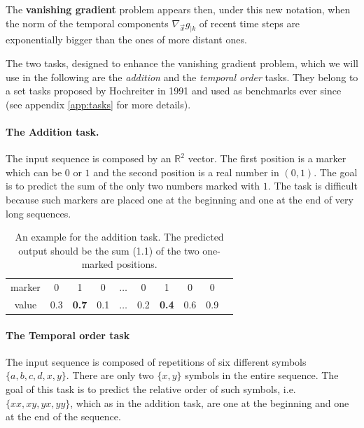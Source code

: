 The \textbf{vanishing gradient} problem appears then, under this new notation, when the norm of the temporal components $\nabla_{\vec{x}} g_{|k}$ of recent time steps  are exponentially bigger than the ones of more distant ones.

The two tasks, designed to enhance the vanishing gradient problem, which we will use in the following are the \textit{addition} and the \textit{temporal order} tasks. They belong to a set tasks proposed by Hochreiter\cite{lstm} in 1991 and used as benchmarks ever since (see appendix \ref{app:tasks} for more details).

\paragraph{The Addition task.}
The input sequence is composed by an $\mathbb{R}^2$ vector. The first position is a marker which can be $0$ or $1$ and the second position is a real number in $(0,1)$. The goal is to predict the sum of the only two numbers marked with $1$. The task is difficult because such markers are placed one at the beginning and one at the end of very long sequences.

\begin{table}[h]
	\centering
\begin{tabular}{|c|c|c|c|c|c|c|c|c|c}
	\hline  marker & 0&  1&  0&  $\hdots$& 0 & 1 & 0 & 0  \\ 
	value & 0.3&  \textbf{0.7}&  0.1&  $\hdots$& 0.2& \textbf{0.4} & 0.6& 0.9  \\ 
	\hline 
\end{tabular}
\caption{An example for the addition task. The predicted output should be the sum (1.1) of the two one-marked positions.}
\label{table:add_example}
\end{table}


\paragraph{The Temporal order task}
The input sequence is composed of repetitions of six different symbols $\{a, b, c, d , x, y\}$.
There are only two $\{x, y\}$ symbols in the entire sequence. The goal of this task is to predict the relative order of such symbols, i.e. $\{xx, xy, yx, yy\}$, which as in the addition task, are one at the beginning and one at the end of the sequence.


